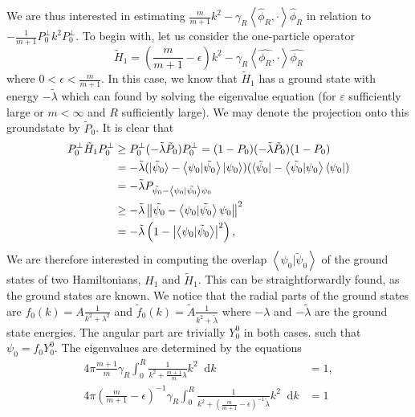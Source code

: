 \documentclass[a4paper,11pt]{article}
\newcommand{\norm}[1]{\left\lVert #1 \right\rVert}
\newcommand{\abs}[1]{\left\lvert #1 \right\rvert}
\renewcommand{\braket}[1]{\left\langle#1\right\rangle}
\newcommand*\diff{\mathop{}\!\mathrm{d}}
\numberwithin{equation}{section}
\begin{document}
We are thus interested in estimating $ \frac{m}{m+1}k^2-\gamma_R\braket{\hat{\phi}_R,\cdot}\hat{\phi}_R $ in relation to $ -\frac{1}{m+1}P_0^\perp k^2P_0^\perp $.
To begin with, let us consider the one-particle operator \begin{equation}
\tilde{H}_1=\left(\frac{m}{m+1}-\epsilon\right)k^2-\gamma_R\braket{\hat{\phi_R},\cdot}\hat{\phi_R}
\end{equation}
where $ 0<\epsilon<\frac{m}{m+1} $. In this case, we know that $ \tilde{H}_1 $ has a ground state with energy $ -\tilde{\lambda} $ which can found by solving the eigenvalue equation (for $ \varepsilon $ sufficiently large or $ m<\infty $ and $ R $ sufficiently large). We may denote the projection onto this groundstate by $ \tilde{P}_0 $. It is clear that \begin{equation}
\begin{aligned}
P_0^\perp\tilde{H}_1P_0^\perp&\geq P_0^\perp(-\tilde{\lambda}\tilde{P}_0)P_0^\perp=(1-P_0)(-\tilde{\lambda}\tilde{P}_0)(1-P_0)\\
&=-\tilde{\lambda}(\ket{\tilde{\psi}_0}-\braket{\psi_0|\tilde{\psi_0}}\ket{\psi_0})(\bra{\tilde{\psi}_0}-\braket{\tilde{\psi_0}|\psi_0}\bra{\psi_0})\\
&=-\tilde{\lambda} P_{\tilde{\psi_0}-\braket{\psi_0|\tilde{\psi_0}}\psi_0}\\
&\geq-\tilde{\lambda}\norm{\tilde{\psi_0}-\braket{\psi_0|\tilde{\psi_0}}\psi_0}^2\\
&=-\tilde{\lambda}\left(1-\abs{\braket{\psi_0|\tilde{\psi}_0}}^2\right),
\end{aligned}
\end{equation}
We are therefore interested in computing the overlap $ \braket{\psi_0|\tilde{\psi}_0} $ of the ground states of two Hamiltonians, $ H_1 $ and $ \tilde{H}_1 $. This can be straightforwardly found, as the ground states are known.
We notice that the radial parts of the ground states are $ f_0(k)=A\frac{1}{k^2+\lambda^2} $ and $ \tilde{f}_0(k)=\tilde{A}\frac{1}{k^2+\tilde{\lambda}} $ where $ -\lambda $ and $ -\tilde{\lambda} $ are the ground state energies. The angular part are trivially $ Y_0^0 $ in both cases. such that $ \psi_0=f_0Y_0^0 $. The eigenvalues are determined by the equations\begin{equation}
\begin{aligned}
4\pi\frac{m+1}{m}\gamma_R\int_{0}^{R}\frac{1}{k^2+\frac{m+1}{m}\lambda} k^2\diff k&=1,\\
4\pi\left(\frac{m}{m+1}-\epsilon\right)^{-1}\gamma_R\int_{0}^{R}\frac{1}{k^2+\left(\frac{m}{m+1}-\epsilon\right)^{-1}\tilde{\lambda}} k^2\diff k&=1
\end{aligned}
\end{equation}
\end{document}
